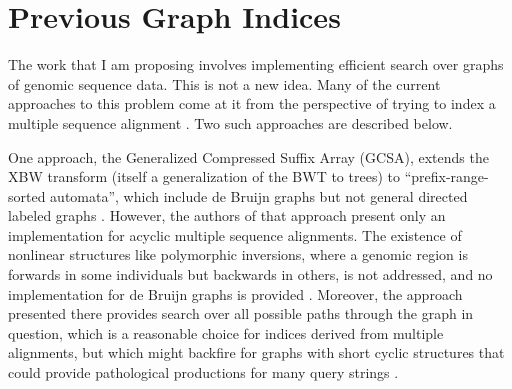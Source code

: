 \documentclass[11pt,proposal]{ucthesis}
\begin{document}





\section{Previous Graph Indices}

The work that I am proposing involves implementing efficient search over graphs of genomic sequence data. This is not a new idea. Many of the current approaches to this problem come at it from the perspective of trying to index a multiple sequence alignment \cite{siren2014indexing}. Two such approaches are described below.

One approach, the Generalized Compressed Suffix Array (GCSA), extends the XBW transform (itself a generalization of the BWT to trees) to ``prefix-range-sorted automata'', which include de Bruijn graphs but not general directed labeled graphs \cite{siren2014indexing}. However, the authors of that approach present only an implementation for acyclic multiple sequence alignments. The existence of nonlinear structures like polymorphic inversions, where a genomic region is forwards in some individuals but backwards in others, is not addressed, and no implementation for de Bruijn graphs is provided \cite{siren2014indexing}. Moreover, the approach presented there provides search over all possible paths through the graph in question, which is a reasonable choice for indices derived from multiple alignments, but which might backfire for graphs with short cyclic structures that could provide pathological productions for many query strings \cite{siren2014indexing}.
\end{document}
